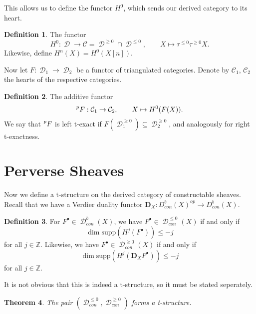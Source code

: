 \documentclass[12pt]{amsart}
\newcommand{\Z}{\mathbb{Z}}
\DeclareMathOperator{\D}{\mathcal{D}}
\newtheorem{theorem}{Theorem}[section]
\theoremstyle{definition}
\newtheorem{definition}[theorem]{Definition}
\theoremstyle{remark}
\numberwithin{equation}{section}
\begin{document}
This allows us to define the functor $H^0$, which sends our derived category to its heart.
\begin{definition}
    The functor
    \begin{equation*}
        H^0: \D \to \mathcal{C} = \D^{\geq 0} \cap \D^{\leq 0}, \qquad
        X \mapsto \tau^{\leq 0} \tau^{\geq 0}X.
    \end{equation*}
    Likewise, define $H^n(X) = H^0(X[n])$.
\end{definition}
Now let $F: \D_1 \to \D_2$ be a functor of triangulated categories. Denote by $\mathcal{C}_1$, $\mathcal{C}_2$ the hearts of the respective categories.
\begin{definition}
    The additive functor
    \begin{equation*}
        \prescript{p}{}{F}: \mathcal{C}_1 \to \mathcal{C}_2,\qquad
        X \mapsto H^0(F(X)).
    \end{equation*}
    We say that $\prescript{p}{}{F}$ is left t-exact if $F(\D_1^{\geq 0}) \subseteq \D_2^{\geq 0}$, and analogously for right t-exactness.
\end{definition}

\section{Perverse Sheaves}

Now we define a t-structure on the derived category of constructable sheaves. Recall that we have a Verdier duality functor $\mathbf{D}_X: D^b_{con}(X)^{op} \to D^b_{con}(X)$.
\begin{definition}
    For $F^\bullet \in \D^b_{con}(X)$, we have $F^\bullet \in \D^{\leq 0}_{con}(X)$ if and only if 
    \[\dim \text{supp}( H^j(F^\bullet)) \leq -j\] for all $j \in \Z$. 
    Likewise, we have $F^\bullet \in \D^{\geq 0}_{con}(X)$ if and only if 
    \[\dim \text{supp}( H^j(\mathbf{D}_X F^\bullet)) \leq -j\] for all $j \in \Z$.
\end{definition}

It is not obvious that this is indeed a t-structure, so it must be stated seperately.
\begin{theorem}
    The pair $(\D_{con}^{\leq 0}, \D_{con}^{\geq 0})$ forms a t-structure. 
\end{theorem}
\end{document}
